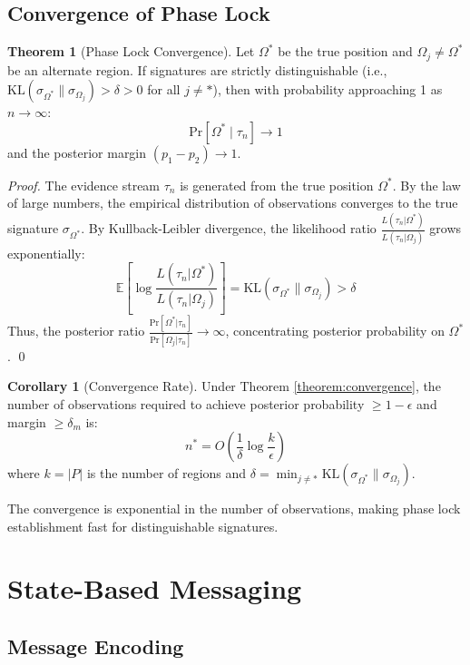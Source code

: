 \documentclass[11pt,a4paper]{article}
\theoremstyle{definition}
\newtheorem{theorem}[definition]{Theorem}
\newtheorem{corollary}[definition]{Corollary}
\newcommand{\pr}[1]{\mathrm{Pr}\left[#1\right]}
\newcommand{\given}{\mid}
\begin{document}
\subsection{Convergence of Phase Lock}

\begin{theorem}[Phase Lock Convergence]
Let $\Omega^*$ be the true position and $\Omega_j \neq \Omega^*$ be an alternate region. If signatures are strictly distinguishable (i.e., $\mathrm{KL}(\sigma_{\Omega^*} \| \sigma_{\Omega_j}) > \delta > 0$ for all $j \neq *$), then with probability approaching 1 as $n \to \infty$:
\[
\pr{\Omega^* \given \tau_n} \to 1
\]
and the posterior margin $(p_1 - p_2) \to 1$.
\end{theorem}

\begin{proof}
The evidence stream $\tau_n$ is generated from the true position $\Omega^*$. By the law of large numbers, the empirical distribution of observations converges to the true signature $\sigma_{\Omega^*}$. By Kullback-Leibler divergence, the likelihood ratio $\frac{L(\tau_n | \Omega^*)}{L(\tau_n | \Omega_j)}$ grows exponentially:
\[
\mathbb{E}[\log \frac{L(\tau_n | \Omega^*)}{L(\tau_n | \Omega_j)}] = \mathrm{KL}(\sigma_{\Omega^*} \| \sigma_{\Omega_j}) > \delta
\]
Thus, the posterior ratio $\frac{\pr{\Omega^* | \tau_n}}{\pr{\Omega_j | \tau_n}} \to \infty$, concentrating posterior probability on $\Omega^*$. \qed
\end{proof}

\begin{corollary}[Convergence Rate]
Under Theorem \ref{theorem:convergence}, the number of observations required to achieve posterior probability $\geq 1 - \epsilon$ and margin $\geq \delta_m$ is:
\[
n^* = O\left(\frac{1}{\delta}\log \frac{k}{\epsilon}\right)
\]
where $k = |P|$ is the number of regions and $\delta = \min_{j \neq *} \mathrm{KL}(\sigma_{\Omega^*} \| \sigma_{\Omega_j})$.
\end{corollary}

The convergence is exponential in the number of observations, making phase lock establishment fast for distinguishable signatures.

\section{State-Based Messaging}
\label{sec:messaging}

\subsection{Message Encoding}
\end{document}
